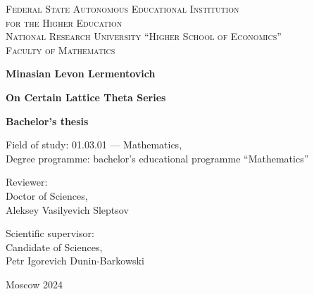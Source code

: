 \documentclass{article}
\theoremstyle{plain}
\theoremstyle{definition}
\begin{document}

\begin{center}
{\scshape Federal State Autonomous Educational Institution\\
for the Higher Education\\
National Research University ``Higher School of Economics''\\[1ex]
Faculty of Mathematics\par}

\par\vfill

\textbf{\large Minasian Levon Lermentovich}

\vspace{1.5cm}

{\Large\bfseries
On Certain Lattice Theta Series
\par}

\vspace{1.5cm}

\textbf{\large Bachelor's thesis}

\vspace{1cm}

Field of study: 01.03.01 --- Mathematics,\\[1ex]
Degree programme: bachelor's educational programme ``Mathematics''
\par\vfill
\noindent\parbox[t]{0.48\textwidth}{%
Reviewer:\\[3pt]
Doctor of Sciences,\\
Aleksey Vasilyevich Sleptsov
}\hspace{0.04\textwidth}\parbox[t]{0.48\textwidth}{%
Scientific supervisor:\\[3pt]
Candidate of Sciences,\\
Petr Igorevich Dunin-Barkowski\\[2ex]
}%
\par\vfill\vfill
Moscow 2024
\end{center}
\thispagestyle{empty}
\pagebreak

\begin{abstract}
    This work partially establishes the connection between polynomials of Riemann theta constants
    and lattice theta series of 24-dimensional unimodular lattices. 
    Both the polynomials of Riemann theta constants and lattice theta series of 16-dimensional
    unimodular lattices were used as modular forms of weight-8 in the 
    modular form approach in construction of superstring measures.
    It was shown that in case for 16-dimensional unimodular lattices
    there are very elegant relations
    between the two.
    We aimed to generalize the question for 24-dimensional unimodular lattices and were able 
    to partially answer it.
\end{abstract}
\end{document}
